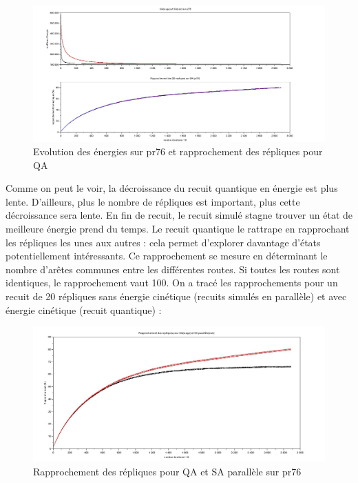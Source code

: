 \documentclass{article}%
\begin{document}
	\begin{figure}[h]
	\begin{center}
	\includegraphics[scale=0.25]{comparaison_pr76.jpg}
	\caption{Evolution des énergies sur pr76 et rapprochement des répliques pour QA}
	\label{QASA}
	\end{center}
	\end{figure}
		
		Comme on peut le voir, la décroissance du recuit quantique en énergie est plus lente. D'ailleurs, plus le nombre de répliques est important, plus cette décroissance sera lente. En fin de recuit, le recuit simulé stagne trouver un état de meilleure énergie prend du temps. Le recuit quantique le rattrape en rapprochant les répliques les unes aux autres : cela permet d'explorer davantage d'états potentiellement intéressants. 
		Ce rapprochement se mesure en déterminant le nombre d'arêtes communes entre les différentes routes. Si toutes les routes sont identiques, le rapprochement vaut 100. On a tracé les rapprochements pour un recuit de 20 répliques sans énergie cinétique (recuits simulés en parallèle) et avec énergie cinétique (recuit quantique) : 
		
	\begin{figure}[!h]
	\begin{center}
	\includegraphics[scale=0.3]{rapprochement.jpg}
	\caption{Rapprochement des répliques pour QA et SA parallèle sur pr76}
	\end{center}
	\end{figure}
\end{document}
